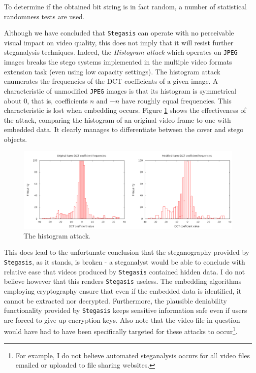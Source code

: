 \documentclass[paper=a4, fontsize=11pt,twoside]{scrartcl}
\numberwithin{table}{section}
\numberwithin{figure}{section}
\numberwithin{algorithm}{section}
\begin{document}
To determine if the obtained bit string is in fact random, a number of statistical randomness tests are used.

Although we have concluded that \texttt{Stegasis} can operate with no perceivable visual impact on video quality, this does not imply that it will resist further steganalysis techniques. Indeed, the \textit{Histogram attack} which operates on \texttt{JPEG} images breaks the stego systems implemented in the multiple video formats extension task (even using low capacity settings). The histogram attack enumerates the frequencies of the DCT coefficients of a given image. A characteristic of unmodified \texttt{JPEG} images is that its histogram is symmetrical about 0, that is, coefficients $n$ and $-n$ have roughly equal frequencies. This characteristic is lost when embedding occurs. Figure \ref{hist} shows the effectiveness of the attack, comparing the histogram of an original video frame to one with embedded data. It clearly manages to differentiate between the cover and stego objects.

\begin{figure}[!tbh]
\centerline{\includegraphics[width=\textwidth]{images/hist.png}}
\caption{The histogram attack.}
\label{hist}
\end{figure}

This does lead to the unfortunate conclusion that the steganography provided by \texttt{Stegasis}, as it stands, is broken - a steganalyst would be able to conclude with relative ease that videos produced by \texttt{Stegasis} contained hidden data. I do not believe however that this renders \texttt{Stegasis} useless. The embedding algorithms employing cryptography ensure that even if the embedded data is identified, it cannot be extracted nor decrypted. Furthermore, the plausible deniability functionality provided by \texttt{Stegasis} keeps sensitive information safe even if users are forced to give up encryption keys. Also note that the video file in question would have had to have been specifically targeted for these attacks to occur\footnote{For example, I do not believe automated steganalysis occurs for all video files emailed or uploaded to file sharing websites.}.
\end{document}
